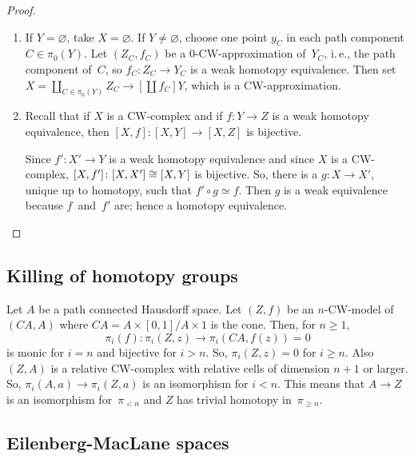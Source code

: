 \documentclass[language=english]{TemplateLecture}
\begin{document}
\begin{proof}\leavevmode
    \begin{enumerate}
        \item If \(Y = \varnothing\), take \(X = \varnothing\).
            If \(Y \ne \varnothing\), choose one point \(y_C\) in each path component \(C \in \pi_0(Y)\).
            Let \((Z_C, f_C)\) be a \(0\)-CW-approximation of~\(Y_C\), i.\,e., the path component of~\(C\), so \(f_C \colon Z_C \to Y_C\) is a weak homotopy equivalence.
            Then set \(X = \coprod_{C \in \pi_0(Y)} Z_C \to[\coprod f_C] Y\), which is a CW-approximation.
        \item Recall that if \(X\) is a CW-complex and if \(f \colon Y \to Z\) is a weak homotopy equivalence, then \([X,f] \colon [X,Y] \to [X,Z]\) is bijective.

            Since \(f' \colon X' \to Y\) is a weak homotopy equivalence and since \(X\) is a CW-complex, \([X,f'] \colon [X,X'] \cong [X,Y]\) is bijective.
            So, there is a \(g \colon X \to X'\), unique up to homotopy, such that \(f' \circ g \simeq f\).
            Then \(g\) is a weak equivalence because \(f\)~and~\(f'\) are; hence a homotopy equivalence. \qedhere
    \end{enumerate}
\end{proof}

\subsection{Killing of homotopy groups}

Let \(A\) be a path connected Hausdorff space.
Let \((Z,f)\) be an \(n\)-CW-model of \((CA,A)\) where \(CA = A \times [0,1] / A \times 1\) is the cone.
Then, for \(n \ge 1\),
\begin{equation*}
    \pi_i(f) \colon \pi_i(Z,z) \to \pi_i(CA, f(z)) = 0
\end{equation*}
is monic for \(i = n\) and bijective for \(i > n\).
So, \(\pi_i(Z,z) = 0\) for \(i \ge n\).
Also \((Z,A)\) is a relative CW-complex with relative cells of dimension \(n+1\) or larger.
So, \(\pi_i(A,a) \to \pi_i(Z,a)\) is an isomorphism for \(i < n\).
This means that \(A \to Z\) is an isomorphism for~\(\pi_{<n}\) and \(Z\) has trivial homotopy in~\(\pi_{\ge n}\).

\subsection{Eilenberg-MacLane spaces}
\end{document}
